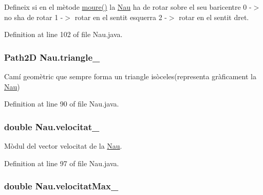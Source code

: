 Defineix si en el mètode \hyperlink{class_nau_a8dc46f91e02910b92bfad9b798f6552c}{moure()} la \hyperlink{class_nau}{Nau} ha de rotar sobre el seu baricentre 0 -\/$>$ no s\textquotesingle{}ha de rotar 1 -\/$>$ rotar en el sentit esquerra 2 -\/$>$ rotar en el sentit dret. 



Definition at line 102 of file Nau.\+java.

\hypertarget{class_nau_ad397487e3dc0062cc71fdfc4c562e347}{}
\subsubsection[{triangle\+\_\+}]{\setlength{\rightskip}{0pt plus 5cm}Path2\+D Nau.\+triangle\+\_\+\hspace{0.3cm}{\ttfamily [protected]}}\label{class_nau_ad397487e3dc0062cc71fdfc4c562e347}


Camí geomètric que sempre forma un triangle isòceles(representa gràficament la \hyperlink{class_nau}{Nau}) 



Definition at line 90 of file Nau.\+java.

\hypertarget{class_nau_ac1151817b8deaed7c77ceba3141b86e5}{}
\subsubsection[{velocitat\+\_\+}]{\setlength{\rightskip}{0pt plus 5cm}double Nau.\+velocitat\+\_\+\hspace{0.3cm}{\ttfamily [protected]}}\label{class_nau_ac1151817b8deaed7c77ceba3141b86e5}


Mòdul del vector velocitat de la \hyperlink{class_nau}{Nau}. 



Definition at line 97 of file Nau.\+java.

\hypertarget{class_nau_a6a18449674ed5d2317a6795bd56f7dd0}{}
\subsubsection[{velocitat\+Max\+\_\+}]{\setlength{\rightskip}{0pt plus 5cm}double Nau.\+velocitat\+Max\+\_\+\hspace{0.3cm}{\ttfamily [private]}}\label{class_nau_a6a18449674ed5d2317a6795bd56f7dd0}


